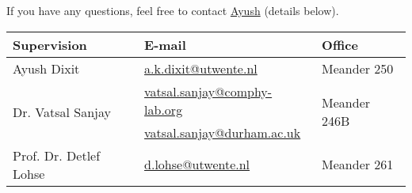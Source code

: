 \documentclass[a4paper,10pt]{article}
\begin{document}
If you have any questions, feel free to contact \href{mailto:a.k.dixit@utwente.nl}{Ayush} (details below).
\begin{center}
\begin{tabular}{|l|l|l|}
\hline \textbf{Supervision} & \textbf{E-mail} & \textbf{Office} \\
\hline Ayush Dixit & \href{mailto:a.k.dixit@utwente.nl}{a.k.dixit@utwente.nl} & Meander 250 \\
\hline \multirow{2}{*}{Dr. Vatsal Sanjay} & \href{mailto:vatsal.sanjay@comphy-lab.org}{vatsal.sanjay@comphy-lab.org} & \multirow{2}{*}{Meander 246B} \\
& \href{mailto:vatsal.sanjay@durham.ac.uk}{vatsal.sanjay@durham.ac.uk} & \\
\hline Prof. Dr. Detlef Lohse & \href{mailto:d.lohse@utwente.nl}{d.lohse@utwente.nl} & Meander 261  \\
\hline
\end{tabular}
\end{center}

\printbibliography
\end{document}

